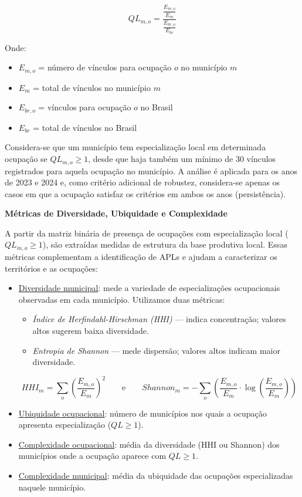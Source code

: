 \[
QL_{m,o} = \frac{\frac{E_{m,o}}{E_m}}{\frac{E_{br,o}}{E_{br}}}
\]

Onde:

\begin{itemize}
	\item $E_{m,o}$ = número de vínculos para ocupação $o$ no município $m$
	\item $E_m$ = total de vínculos no município $m$
	\item $E_{br,o}$ = vínculos para ocupação $o$ no Brasil
	\item $E_{br}$ = total de vínculos no Brasil
\end{itemize}

Considera-se que um município tem especialização local em determinada ocupação se $QL_{m,o} \geq 1$, desde que haja também um mínimo de 30 vínculos registrados para aquela ocupação no município. A análise é aplicada para os anos de 2023 e 2024 e, como critério adicional de robustez, considera-se apenas os casos em que a ocupação satisfaz os critérios em ambos os anos (persistência).

\vspace{1em}

\textbf{Métricas de Diversidade, Ubiquidade e Complexidade}

A partir da matriz binária de presença de ocupações com especialização local ($QL_{m,o} \geq 1$), são extraídas medidas de estrutura da base produtiva local. Essas métricas complementam a identificação de APLs e ajudam a caracterizar os territórios e as ocupações:

\begin{itemize}
	\item \underline{Diversidade municipal}: mede a variedade de especializações ocupacionais observadas em cada município. Utilizamos duas métricas:
	\begin{itemize}
		\item \textit{Índice de Herfindahl-Hirschman (HHI)} — indica concentração; valores altos sugerem baixa diversidade.
		\item \textit{Entropia de Shannon} — mede dispersão; valores altos indicam maior diversidade.
	\end{itemize}
	
	\[
	HHI_m = \sum_o \left(\frac{E_{m,o}}{E_m}\right)^2
	\qquad\text{e}\qquad
	Shannon_m = -\sum_o \left(\frac{E_{m,o}}{E_m} \cdot \log \left( \frac{E_{m,o}}{E_m} \right) \right)
	\]
	
	\item \underline{Ubiquidade ocupacional}: número de municípios nos quais a ocupação apresenta especialização ($QL \geq 1$).
	
	\item \underline{Complexidade ocupacional}: média da diversidade (HHI ou Shannon) dos municípios onde a ocupação aparece com $QL \geq 1$.
	
	\item \underline{Complexidade municipal}: média da ubiquidade das ocupações especializadas naquele município.
\end{itemize}


